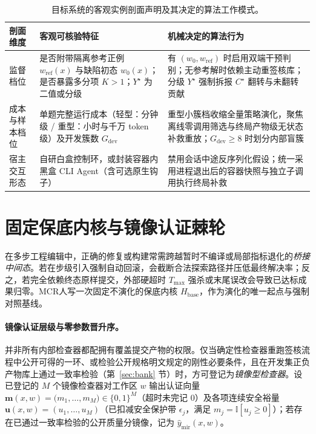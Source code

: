 \documentclass[UTF8,a4paper,10.5pt]{ctexart}
\newcommand{\method}{MCR}
\newcommand{\Ind}{\mathbb{I}}
\begin{document}
\begin{table}[t]
\centering\small
\caption{目标系统的客观实例剖面声明及其决定的算法工作模式。}
\label{tab:profile}
\begin{tabular}{L{2.8cm}L{5.2cm}L{6.2cm}}
\toprule
剖面维度 & 客观可核验特征 & 机械决定的算法行为 \\
\midrule
监督档位 & 是否附带隔离参考正例 $w_{\mathrm{ref}}(x)$ 与缺陷初态 $w_0(x)$；是否暴露多分项 $K>1$；$Y^\star$ 为二值或分级 & 有 $(w_0,w_{\mathrm{ref}})$ 时启用双端干预判别；无参考解时依赖主动重签核库；分级 $Y^\star$ 强制拆报 $C^\star$ 翻转与未翻转贡献 \\
成本与样本档位 & 单题完整运行成本（轻型：分钟级 / 重型：小时与千万 token 级）及开发簇数 $G_{\mathrm{dev}}$ & 重型小簇档收缩全量策略演化，聚焦离线零调用筛选与终局产物级无状态补救重放；$G_{\mathrm{dev}}\ge 8$ 时划分内部盲簇 \\
宿主交互形态 & 自研白盒控制环，或封装容器内黑盒 CLI Agent（含可选原生钩子） & 禁用会话中途反序列化假设；统一采用进程退出后的容器快照与独立子调用执行终局补救 \\
\bottomrule
\end{tabular}
\end{table}

\section{固定保底内核与镜像认证棘轮}
\label{sec:kernel}

在多步工程编辑中，正确的修复或构建常需跨越暂时不编译或局部指标退化的\emph{桥接中间态}。若在步级引入强制自动回滚，会截断合法探索路径并压低最终解决率；反之，若完全依赖终态原样提交，外部硬超时 $T_{\max}$ 强杀或末尾误改会导致已达标成果归零。\method{}人写一次固定不演化的保底内核 $H_{\mathrm{base}}$，作为演化的唯一起点与强制对照基线。

\paragraph{镜像认证层级与零参数晋升序。}
并非所有内部检查器都配拥有覆盖提交产物的权限。仅当确定性检查器重跑签核流程中公开可得的一环、或检验公开规格明文规定的刚性必要条件，且在开发集正负产物库上通过一致率检验（第~\ref{sec:bank} 节）时，方可登记为\emph{镜像型检查器}。设已登记的 $M$ 个镜像检查器对工作区 $w$ 输出认证向量 $\mathbf{m}(x,w)=\bigl(m_1,\dots,m_M\bigr)\in\{0,1\}^M$（超时未完记 $0$）及各项连续安全裕量 $\mathbf{u}(x,w)=(u_1,\dots,u_M)$（已扣减安全保护带 $\epsilon_j$，满足 $m_j=\Ind[u_j\ge 0]$）；若存在已通过一致率检验的公开质量分镜像，记为 $\hat{y}_{\mathrm{mir}}(x,w)$。
\end{document}

